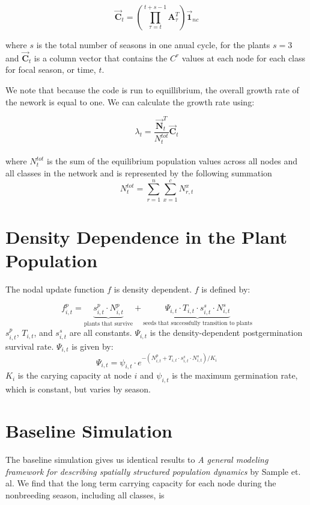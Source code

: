 \documentclass[10pt]{article}
\begin{document}
\begin{equation}
\vec{\mathbf{C}}_t=\left(\prod_{\tau=t}^{t+s-1}\mathbf{A}_\tau^T\right)\vec{\mathbf{1}}_{nc}
\end{equation}

where $s$ is the total number of seasons in one anual cycle, for the plants $s=3$ and $\vec{\mathbf{C}}_t$ is a column vector that contains the $C^r$ values at each node for each class for focal season, or time, $t$. 

We note that because the code is run to equillibrium, the overall growth rate of the nework is equal to one. We can calculate the growth rate using:

\begin{equation}
\lambda_t= \frac{\vec{\mathbf{N}}_t^T}{N_t^{tot}}\vec{\mathbf{C}}_t
\label{lambda}
\end{equation}\\
where $N_t^{tot}$ is the sum of the equilibrium population values across all nodes and all classes in the network and is represented by the following summation
\begin{equation}
N_t^{tot}=\sum_{r=1}^n\sum_{x=1}^{c}N^x_{r,t}
\end{equation}

\section{Density Dependence in the Plant Population}
%
The nodal update function $f$ is density dependent. $f$ is defined by:

\begin{equation}\label{f_update}
f_{i,t}^p = \underbrace{s_{i,t}^p\cdot N_{i,t}^p}_\text{plants that survive}+\underbrace{\Psi_{i,t}\cdot T_{i,t}\cdot s_{i,t}^s\cdot N_{i,t}^s}_\text{seeds that successfully transition to plants}
\end{equation}
%
$s_{i,t}^p$, $T_{i,t}$, and $s_{i,t}^s$ are all constants. $\Psi_{i,t}$ is the density-dependent postgermination survival rate. $\Psi_{i,t}$ is given by:
%
\begin{equation}\label{psi_equation}
\Psi_{i,t} = \psi_{i,t} \cdot e^{-(N_{i,t}^p+T_{i,t}\cdot s_{i,t}^s\cdot N_{i,t}^s)/K_i}
\end{equation}
%
$K_i$ is the carying capacity at node $i$ and $\psi_{i,t}$ is the maximum germination rate, which is constant, but varies by season. 
%
\section{Baseline Simulation}
% 
The baseline simulation gives us identical results to {\it{A general modeling framework for describing spatially
structured population dynamics}} by Sample et. al. We find that the long term carrying capacity for each node during the nonbreeding season, including all classes, is
\end{document}
